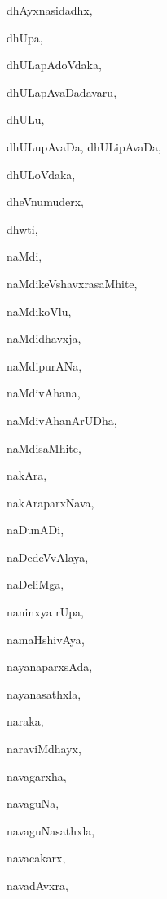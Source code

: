 \begin{multicols}{2}
{dhAyxnasidadhx}, \pageref{dhAyxnasidadhx}

{dhUpa}, \pageref{dhUpa}

{dhULapAdoVdaka}, \pageref{dhULapAdoVdaka}

{dhULapAvaDadavaru}, \pageref{dhULapAvaDadavaru}

{dhULu}, \pageref{dhULu}

{dhULupAvaDa, dhULipAvaDa}, \pageref{dhULupAvaDa, dhULipAvaDa}

{dhULoVdaka}, \pageref{dhULoVdaka}

{dheVnumuderx}, \pageref{dheVnumuderx}

{dhwti}, \pageref{dhwti}

{naMdi}, \pageref{naMdi}

{naMdikeVshavxrasaMhite}, \pageref{naMdikeVshavxrasaMhite}

{naMdikoVlu}, \pageref{naMdikoVlu}

{naMdidhavxja}, \pageref{naMdidhavxja}

{naMdipurANa}, \pageref{naMdipurANa}

{naMdivAhana}, \pageref{naMdivAhana}

{naMdivAhanArUDha}, \pageref{naMdivAhanArUDha}

{naMdisaMhite}, \pageref{naMdisaMhite}

{nakAra}, \pageref{nakAra}

{nakAraparxNava}, \pageref{nakAraparxNava}

{naDunADi}, \pageref{naDunADi}

{naDedeVvAlaya}, \pageref{naDedeVvAlaya}

{naDeliMga}, \pageref{naDeliMga}

{naninxya rUpa}, \pageref{naninxya rUpa}

{namaHshivAya}, \pageref{namaHshivAya}

{nayanaparxsAda}, \pageref{nayanaparxsAda}

{nayanasathxla}, \pageref{nayanasathxla}

{naraka}, \pageref{naraka}

{naraviMdhayx}, \pageref{naraviMdhayx}

{navagarxha}, \pageref{navagarxha}

{navaguNa}, \pageref{navaguNa}

{navaguNasathxla}, \pageref{navaguNasathxla}

{navacakarx}, \pageref{navacakarx}

{navadAvxra}, \pageref{navadAvxra}


\end{multicols}
